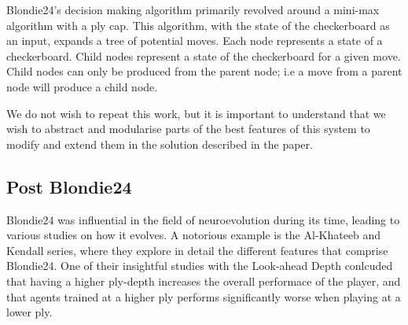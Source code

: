 \documentclass[12pt,a4paper]{article}
\begin{document}
        Blondie24's decision making algorithm primarily revolved around a mini-max algorithm with a ply cap. This algorithm, with the state of the checkerboard as an input, expands a tree of potential moves. Each node represents a state of a checkerboard. Child nodes represent a state of the checkerboard for a given move. Child nodes can only be produced from the parent node; i.e a move from a parent node will produce a child node. 
    
%    
%    

        We do not wish to repeat this work, but it is important to understand that we wish to abstract and modularise parts of the best features of this system to modify and extend them in the solution described in the paper.

        \subsection{Post Blondie24}

        Blondie24 was influential in the field of neuroevolution during its time, leading to various studies on how it evolves. A notorious example is the Al-Khateeb and Kendall series, where they explore in detail the different features that comprise Blondie24. One of their insightful studies with the Look-ahead Depth \cite{al-khateeb_effect_2012} conlcuded that having a higher ply-depth increases the overall performace of the player, and that agents trained at a higher ply performs significantly worse when playing at a lower ply.
        
\end{document}
